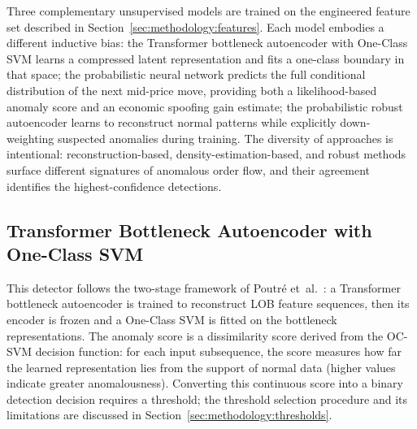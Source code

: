 \documentclass[11pt]{report}
\begin{document}
Three complementary unsupervised models are trained on the engineered feature set described in Section~\ref{sec:methodology:features}. Each model embodies a different inductive bias: the Transformer bottleneck autoencoder with One-Class SVM learns a compressed latent representation and fits a one-class boundary in that space; the probabilistic neural network predicts the full conditional distribution of the next mid-price move, providing both a likelihood-based anomaly score and an economic spoofing gain estimate; the probabilistic robust autoencoder learns to reconstruct normal patterns while explicitly down-weighting suspected anomalies during training. The diversity of approaches is intentional: reconstruction-based, density-estimation-based, and robust methods surface different signatures of anomalous order flow, and their agreement identifies the highest-confidence detections.


\subsection{Transformer Bottleneck Autoencoder with One-Class SVM}\label{subsec:models:tfocsvm}

This detector follows the two-stage framework of Poutr\'e et~al.~\cite{poutre_2024}: a Transformer bottleneck autoencoder is trained to reconstruct LOB feature sequences, then its encoder is frozen and a One-Class SVM is fitted on the bottleneck representations. The anomaly score is a dissimilarity score derived from the OC-SVM decision function: for each input subsequence, the score measures how far the learned representation lies from the support of normal data (higher values indicate greater anomalousness). Converting this continuous score into a binary detection decision requires a threshold; the threshold selection procedure and its limitations are discussed in Section~\ref{sec:methodology:thresholds}.
\end{document}
